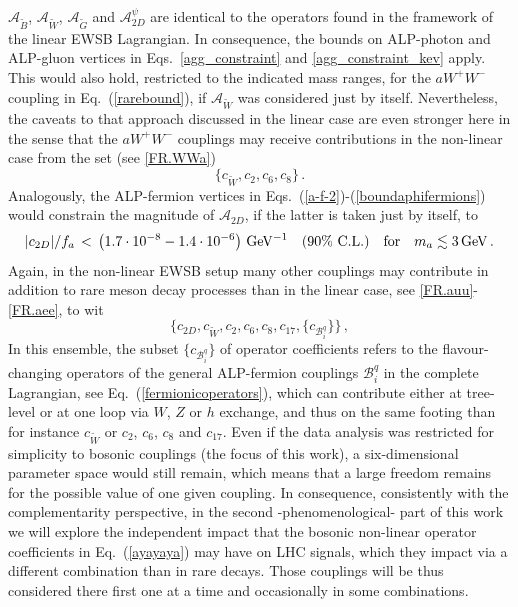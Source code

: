\documentclass[11pt]{article}
\newcommand{\A}{\mathcal{A}}
\newcommand{\B}{\mathcal{B}}
\newcommand{\cl}{\%\,\,  \text{C.L.}}
\newcommand{\beq}{\begin{equation}}
\newcommand{\eeq}{\end{equation}}
\renewcommand{\[}{\begin{equation}}
\renewcommand{\]}{\end{equation}}
\begin{document}
$\A_{\tilde{B}}$,  $\A_{\tilde{W}}$, $\A_{\tilde{G}}$ and $\A_{2D}^\psi$  
  are identical to the operators found in the framework of the  linear EWSB Lagrangian. In consequence, the bounds on ALP-photon and  ALP-gluon vertices in Eqs.~\eqref{agg_constraint} and  \eqref{agg_constraint_kev} apply. This would also hold, restricted to the indicated mass ranges,  for the $aW^+W^-$ coupling in Eq.~(\ref{rarebound}), if $\A_{\tilde W}$ was considered just by itself. Nevertheless, the caveats to that approach discussed in the linear case are even stronger here in the sense that the $aW^+W^-$ couplings may receive contributions in the non-linear case from the set (see \ref{FR.WWa})
 \begin{equation}\label{ja}
 \{c_{\tilde W}, c_2, c_6, c_8\}\,.
 \end{equation}
 Analogously, the ALP-fermion vertices in Eqs.~(\ref{a-f-2})-(\ref{boundaphifermions}) would constrain the magnitude of $\A_{2D}$, if the latter is taken just by itself, to 
 \beq
 \label{boundc2Dfermions}
|c_{2D}|/f_a\,<\,\unit[\left(1.7\cdot 10^{-8} - 1.4\cdot10^{-6}\right)]{GeV^{-1}} \quad(90\cl)   \quad \text{for}\quad m_a \lesssim \unit[3]{GeV}\,.
\eeq 
Again, in the non-linear EWSB setup many other couplings may contribute in addition %
to rare meson decay processes than in the linear case, see \ref{FR.auu}-\ref{FR.aee}, to wit
 \begin{equation}\label{ayayaya}
 \{c_{2D}, c_{\tilde W}, c_2, c_6, c_8, c_{17}, \{c_{\B^q_i}\}\}\,,
 \end{equation}
 In this ensemble, the subset $\{c_{\B^q_i}\}$ of operator coefficients refers to the flavour-changing operators of the general ALP-fermion 
 couplings $\B^{q}_i$ in the complete Lagrangian, see Eq.~(\ref{fermionicoperators}), which can contribute either at tree-level or at one loop via $W$, $Z$ or $h$ exchange, and thus on the same footing than for instance $c_{\tilde W}$ or $c_2$, $c_6$, $c_8$ and $c_{17}$.
 Even if the data analysis was restricted for simplicity to bosonic couplings (the focus of this work), a six-dimensional parameter space would still remain, which means that a large freedom remains for the possible value of one given coupling. In consequence,  
 consistently with the complementarity perspective, in the second -phenomenological- part of this work we will explore  the independent impact that the bosonic non-linear operator coefficients in Eq.~(\ref{ayayaya}) may have on LHC signals, which they impact via a different combination than in rare decays. Those couplings will be thus considered   there first one at a time and occasionally in some combinations.
\end{document}
